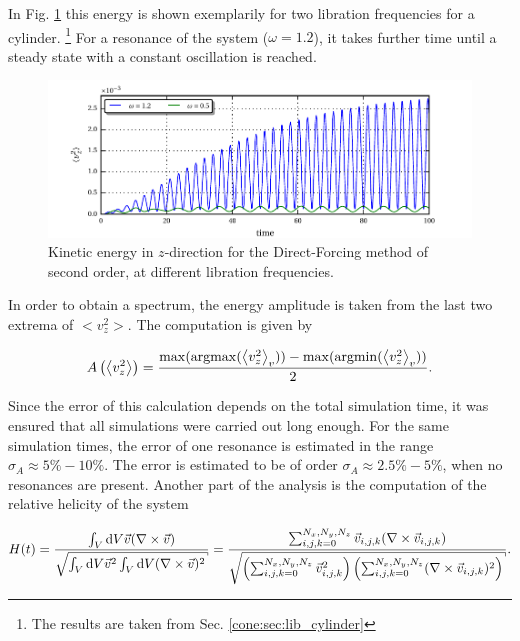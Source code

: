 In Fig. \ref{fig:cone:cyl_vzmode} this energy is shown exemplarily for two libration frequencies for a cylinder.
\footnote{The results are taken from Sec. \ref{cone:sec:lib_cylinder}}
For a resonance of the system ($\omega=1.2$), it takes further time until a steady state with a constant oscillation is reached.

\begin{figure}[!pb]
  \includegraphics{gfx/cone/cylinder/cyl_vz.pdf}
  \caption{Kinetic energy in $z$-direction for the Direct-Forcing method of second order, at different libration frequencies.
  \label{fig:cone:cyl_vzmode}
  }
\end{figure}
\clearpage

In order to obtain a spectrum, the energy amplitude is taken from the last two extrema of $<v_z^2>$.
The computation is given by

\begin{align}
    A\left(\left<v_z^2\right>\right) = \frac{\max(\operatorname*{argmax}(\left<v_z^2\right>_{v})) - \max(\operatorname*{argmin}(\left<v_z^2\right>_{v}))}{2}.
\end{align}

Since the error of this calculation depends on the total simulation time, it was ensured that all simulations
were carried out long enough.
For the same simulation times, the error of one resonance is estimated in the range $\sigma_A \approx 5\% - 10\%$.
The error is estimated to be of order $\sigma_A \approx 2.5\% - 5\%$, when no resonances are present.
Another part of the analysis is the computation of the relative helicity of the system

\begin{align}
H(t) = \frac{\int_V \dif V \vec{v} (\nabla \times \vec{v})}
{\sqrt{\int_V \dif V \vec{v}^2 \int_V \dif V (\nabla \times \vec{v})^2}}
 = \frac{\sum_{i,j,k=0}^{N_x, N_y, N_z} \vec{v}_{i,j,k} (\nabla \times \vec{v}_{i, j, k})}
 {\sqrt{\left(\sum_{i,j,k=0}^{N_x, N_y, N_z}\vec{v}_{i,j,k}^2\right)
 \left(\sum_{i,j,k=0}^{N_x, N_y, N_z}
  (\nabla \times \vec{v}_{i, j, k})^2\right)}}.
\end{align}

